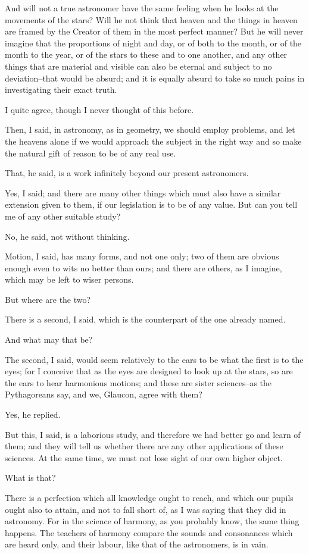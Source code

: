 And will not a true astronomer have the same feeling when he looks at
the movements of the stars? Will he not think that heaven and the things
in heaven are framed by the Creator of them in the most perfect manner?
But he will never imagine that the proportions of night and day, or of
both to the month, or of the month to the year, or of the stars to these
and to one another, and any other things that are material and visible
can also be eternal and subject to no deviation--that would be absurd;
and it is equally absurd to take so much pains in investigating their
exact truth.

I quite agree, though I never thought of this before.

Then, I said, in astronomy, as in geometry, we should employ problems,
and let the heavens alone if we would approach the subject in the right
way and so make the natural gift of reason to be of any real use.

That, he said, is a work infinitely beyond our present astronomers.

Yes, I said; and there are many other things which must also have a
similar extension given to them, if our legislation is to be of any
value. But can you tell me of any other suitable study?

No, he said, not without thinking.

Motion, I said, has many forms, and not one only; two of them are
obvious enough even to wits no better than ours; and there are others,
as I imagine, which may be left to wiser persons.

But where are the two?

There is a second, I said, which is the counterpart of the one already
named.

And what may that be?

The second, I said, would seem relatively to the ears to be what the
first is to the eyes; for I conceive that as the eyes are designed to
look up at the stars, so are the ears to hear harmonious motions; and
these are sister sciences--as the Pythagoreans say, and we, Glaucon,
agree with them?

Yes, he replied.

But this, I said, is a laborious study, and therefore we had better go
and learn of them; and they will tell us whether there are any other
applications of these sciences. At the same time, we must not lose sight
of our own higher object.

What is that?

There is a perfection which all knowledge ought to reach, and which our
pupils ought also to attain, and not to fall short of, as I was saying
that they did in astronomy. For in the science of harmony, as you
probably know, the same thing happens. The teachers of harmony compare
the sounds and consonances which are heard only, and their labour, like
that of the astronomers, is in vain.

